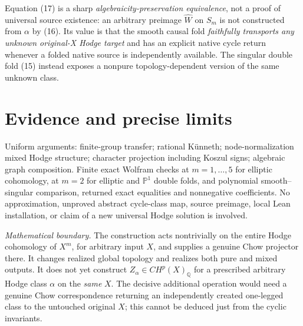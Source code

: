 \documentclass[11pt]{article}
\begin{document}
Equation (17) is a sharp \emph{algebraicity-preservation
equivalence}, not a proof of universal source existence:
an arbitrary preimage $\widehat W$ on $S_m$ is not
constructed from $\alpha$ by (16).  Its value is that
the smooth causal fold \emph{faithfully transports any
unknown original-X Hodge target} and has an explicit
native cycle return whenever a folded native source
is independently available. The singular double fold
(15) instead exposes a nonpure topology-dependent
version of the same unknown class.

\section{Evidence and precise limits}
Uniform arguments: finite-group transfer; rational K\"unneth;
node-normalization mixed Hodge structure; character projection
including Koszul signs; algebraic graph composition.
Finite exact Wolfram checks at $m=1,\ldots,5$ for elliptic
cohomology, at $m=2$ for elliptic and $\mathbb P^1$ double
folds, and polynomial smooth--singular comparison, returned
exact equalities and nonnegative coefficients.
No approximation, unproved abstract cycle-class map,
source preimage, local Lean installation, or claim of a
new universal Hodge solution is involved.

\emph{Mathematical boundary.}
The construction acts nontrivially on the entire Hodge
cohomology of $X^m$, for arbitrary input $X$, and supplies
a genuine Chow projector there.  It changes realized
global topology and realizes both pure and mixed outputs.
It does not yet construct $Z_\alpha\in CH^p(X)_{\mathbb Q}$
for a prescribed arbitrary Hodge class $\alpha$ on the
\emph{same} $X$. The decisive additional operation would
need a genuine Chow correspondence returning an independently
created one-legged class to the untouched original $X$;
this cannot be deduced just from the cyclic invariants.
\end{document}
